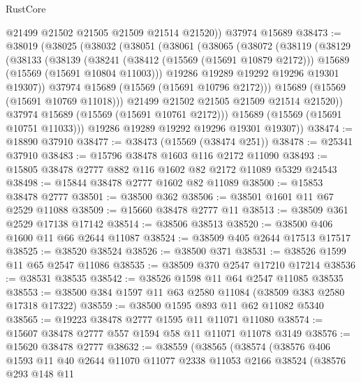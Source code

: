 \begin{lexlean}{RustCore}
\begin{coremodule}
        @21499
        @21502
        @21505
        @21509
        @21514
        @21520))
    @37974
    @15689
@38473 := @38019
    (@38025
      (@38032
        (@38051
          (@38061
            (@38065
              (@38072
                (@38119
                  (@38129
                    (@38133
                      (@38139
                        (@38241
                          (@38412 (@15569 (@15691 @10879 @2172)))
                          @15689
                          (@15569 (@15691 @10804 @11003)))
                        @19286
                        @19289
                        @19292
                        @19296
                        @19301
                        @19307))
                    @37974
                    @15689
                    (@15569 (@15691 @10796 @2172)))
                  @15689
                  (@15569 (@15691 @10769 @11018)))
                @21499
                @21502
                @21505
                @21509
                @21514
                @21520))
            @37974
            @15689
            (@15569 (@15691 @10761 @2172)))
          @15689
          (@15569 (@15691 @10751 @11033)))
        @19286
        @19289
        @19292
        @19296
        @19301
        @19307))
@38474 := @18890 @37910
@38477 := @38473 (@15569 (@38474 @251))
@38478 := @25341 @37910
@38483 := @15796 @38478 @1603 @116 @2172 @11090
@38493 := @15805 @38478 @2777 @882 @116 @1602 @82 @2172 @11089 @5329 @24543
@38498 := @15844 @38478 @2777 @1602 @82 @11089
@38500 := @15853 @38478 @2777
@38501 := @38500 @362
@38506 := @38501 @1601 @11 @67 @2529 @11088
@38509 := @15660 @38478 @2777 @11
@38513 := @38509 @361 @2529 @17138 @17142
@38514 := @38506 @38513
@38520 := @38500 @406 @1600 @11 @66 @2644 @11087
@38524 := @38509 @405 @2644 @17513 @17517
@38525 := @38520 @38524
@38526 := @38500 @371
@38531 := @38526 @1599 @11 @65 @2547 @11086
@38535 := @38509 @370 @2547 @17210 @17214
@38536 := @38531 @38535
@38542 := @38526 @1598 @11 @64 @2547 @11085 @38535
@38553 := @38500 @384 @1597 @11 @63 @2580 @11084 (@38509 @383 @2580 @17318 @17322)
@38559 := @38500 @1595 @893 @11 @62 @11082 @5340
@38565 := @19223 @38478 @2777 @1595 @11 @11071 @11080
@38574 := @15607 @38478 @2777 @557 @1594 @58 @11 @11071 @11078 @3149
@38576 := @15620 @38478 @2777
@38632 := @38559
    (@38565
      (@38574
        (@38576
          @406
          @1593
          @11
          @40
          @2644
          @11070
          @11077
          @2338
          @11053
          @2166
          @38524
          (@38576
            @293
            @148
            @11

\end{coremodule}
\end{lexlean}
